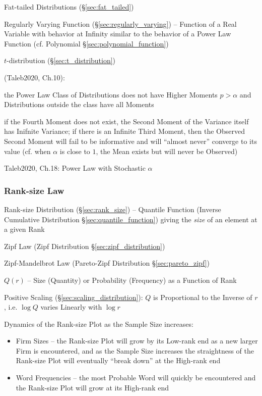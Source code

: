 \fist Fat-tailed Distributions (\S\ref{sec:fat_tailed})

\fist Regularly Varying Function (\S\ref{sec:regularly_varying}) -- Function of
a Real Variable with behavior at Infinity similar to the behavior of a Power Law
Function (cf. Polynomial \S\ref{sec:polynomial_function})

$t$-distribution (\S\ref{sec:t_distribution})

(Taleb2020, Ch.10):

the Power Law Class of Distributions does not have Higher Moments $p > \alpha$
and Distributions outside the class have all Moments

if the Fourth Moment does not exist, the Second Moment of the Variance itself
has Inifnite Variance; if there is an Infinite Third Moment, then the Observed
Second Moment will fail to be informative and will ``almost never'' converge to
its value (cf. when $\alpha$ is close to $1$, the Mean exists but will never be
Observed)

Taleb2020, Ch.18: Power Law with Stochastic $\alpha$



\subsubsection{Rank-size Law}\label{sec:ranksize_law}

Rank-size Distribution (\S\ref{sec:rank_size}) -- Quantile Function (Inverse
Cumulative Distribution \S\ref{sec:quantile_function}) giving the \emph{size} of
an element at a given Rank

Zipf Law (Zipf Distribution \S\ref{sec:zipf_distribution})

Zipf-Mandelbrot Law (Pareto-Zipf Distribution \S\ref{sec:pareto_zipf})

$Q(r)$ -- Size (Quantity) or Probability (Frequency) as a Function of Rank

Positive Scaling (\S\ref{sec:scaling_distribution}): $Q$ is Proportional to the
Inverse of $r$, i.e. $\log Q$ varies Linearly with $\log r$

Dynamics of the Rank-size Plot as the Sample Size increases:
\begin{itemize}
  \item Firm Sizes -- the Rank-size Plot will grow by its Low-rank end as a new
    larger Firm is encountered, and as the Sample Size increases the
    straightness of the Rank-size Plot will eventually ``break down'' at the
    High-rank end
  \item Word Frequencies -- the most Probable Word will quickly be encountered
    and the Rank-size Plot will grow at its High-rank end
\end{itemize}



